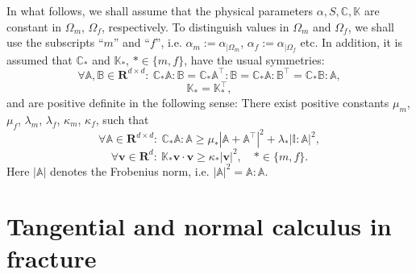 \documentclass[a4paper]{article}
\def\CC{\tn C}
\def\nnu{\vc\nu}
\def\Real{{\mathbf R}}
\def\tn#1{{\mathbb{#1}}}    %
\def\vc#1{\mathbf{\boldsymbol{#1}}}     %
\def\vv{\vc v}
\newcommand{\eq}[1]{\begin{equation}#1\end{equation}}
\begin{document}
In what follows, we shall assume that the physical parameters $\alpha,S,\CC,\tn K$ are constant in $\Omega_m$, $\Omega_f$, respectively.
To distinguish values in $\Omega_m$ and $\Omega_f$, we shall use the subscripts ``$m$'' and ``$f$'', i.e. $\alpha_m := \alpha_{|\Omega_m}$, $\alpha_f := \alpha_{|\Omega_f}$ etc.
In addition, it is assumed that $\CC_*$ and $\tn K_*$, $*\in\{m,f\}$, have the usual symmetries:
\eq{ \label{eq:sym_C} \forall \tn A,\tn B\in\Real^{d\times d}:~ \CC_*\tn A:\tn B=\CC_*\tn A^\top:\tn B=\CC_*\tn A:\tn B^\top=\CC_*\tn B:\tn A, }
\eq{ \tn K_* = \tn K_*^\top, }
and are positive definite in the following sense:
There exist positive constants $\mu_m$, $\mu_f$, $\lambda_m$, $\lambda_f$, $\kappa_m$, $\kappa_f$, such that
\eq{ \label{eq:pos_def_C_gen} \forall\tn A\in\Real^{d\times d}:~\CC_*\tn A:\tn A \ge \mu_*\left|\tn A+\tn A^\top\right|^2 + \lambda_*|\tn I:\tn A|^2, }
\eq{ \forall\vv\in\Real^d:~\tn K_*\vv\cdot\vv \ge \kappa_*|\vv|^2,\quad *\in\{m,f\}. }
Here %
$|\tn A|$ denotes the Frobenius norm, i.e. $|\tn A|^2=\tn A:\tn A$.




\section{Tangential and normal calculus in fracture}\label{sec:calculus}
\end{document}
